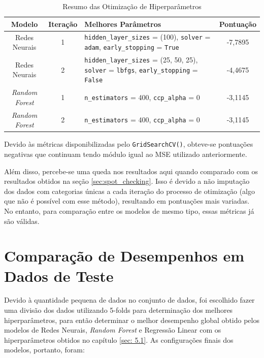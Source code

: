 \documentclass{report}
\let\oldsection\section
\renewcommand\section{\clearpage\oldsection}
\begin{document}
\begin{table}[h!]
  \centering
  \begin{tabular}{| c | c | M{58mm} | c |}
      \hline
      \textbf{Modelo} & \textbf{Iteração} & \textbf{Melhores Parâmetros} & \textbf{Pontuação} \\
      \hline
      Redes Neurais & 1 & \texttt{hidden\_layer\_sizes} = (100), \newline \texttt{solver} = \texttt{adam}, \newline \texttt{early\_stopping} = \texttt{True} & -7,7895 \\
      \hline
      Redes Neurais & 2 & \texttt{hidden\_layer\_sizes} = (25, 50, 25), \newline \texttt{solver} = \texttt{lbfgs}, \newline \texttt{early\_stopping} = \texttt{False} & -4,4675 \\
      \hline
      \textit{Random Forest} & 1 & \texttt{n\_estimators} = 400, \newline \texttt{ccp\_alpha} = 0 & -3,1145 \\
      \hline
      \textit{Random Forest} & 2 & \texttt{n\_estimators} = 400, \newline \texttt{ccp\_alpha} = 0 & -3,1145 \\
      \hline
  \end{tabular}
  \caption{\label{table:optimization_summary} Resumo das Otimização de Hiperparâmetros}
\end{table}

Devido às métricas disponibilizadas pelo \texttt{GridSearchCV()}, obteve-se pontuações negativas que continuam tendo módulo igual ao MSE utilizado anteriormente.

Além disso, percebe-se uma queda nos resultados aqui quando comparado com os resultados obtidos na seção \ref{sec:spot_checking}. Isso é devido a não imputação dos dados com categorias
únicas a cada iteração do processo de otimização (algo que não é possível com esse método), resultando em pontuações mais variadas. No entanto, para comparação entre os modelos de mesmo
tipo, essas métricas já são válidas.

\section{Comparação de Desempenhos em Dados de Teste}
Devido à quantidade pequena de dados no conjunto de dados, foi escolhido fazer uma divisão dos dados utilizando 5-folds para determinação dos melhores hiperparâmetros, para então determinar
o melhor desempenho global obtido pelos modelos de Redes Neurais, \textit{Random Forest} e Regressão Linear com os hiperparâmetros obtidos no capítulo \ref{sec: 5.1}. As configurações finais dos
modelos, portanto, foram:
\end{document}
